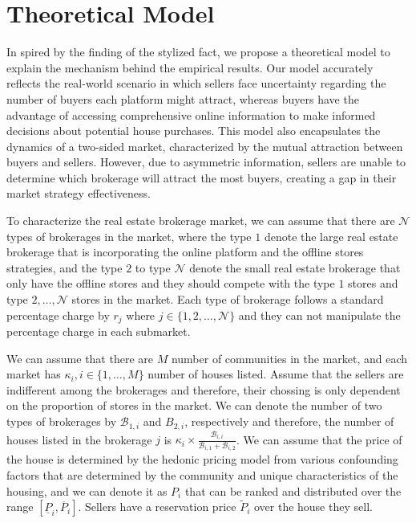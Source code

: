 \documentclass[12pt]{article}
\begin{document}
\section{Theoretical Model} \label{sec:theoretical_model}




In spired by the finding of the stylized fact, we propose a theoretical model to explain the mechanism behind the empirical results. Our model accurately reflects the real-world scenario in which sellers face uncertainty regarding the number of buyers each platform might attract, whereas buyers have the advantage of accessing comprehensive online information to make informed decisions about potential house purchases. This model also encapsulates the dynamics of a two-sided market, characterized by the mutual attraction between buyers and sellers. However, due to asymmetric information, sellers are unable to determine which brokerage will attract the most buyers, creating a gap in their market strategy effectiveness.

To characterize the real estate brokerage market, we can assume that there are $\mathcal{N}$ types of brokerages in the market, where the type $1$ denote the large real estate brokerage that is incorporating the online platform and the offline stores strategies, and the type $2$ to type $\mathcal{N}$ denote the small real estate brokerage that only have the offline stores and they should compete with the type $1$ stores and type $2, \ldots, \mathcal{N}$ stores in the market. Each type of brokerage follows a standard percentage charge by $r_j$ where $j \in \{1, 2, \ldots, \mathcal{N}\}$ and they can not manipulate the percentage charge in each submarket.

We can assume that there are $M$ number of communities in the market, and each market has $\kappa_i, i \in \{1, \ldots, M\}$ number of houses listed. Assume that the sellers are indifferent among the brokerages and therefore, their chossing is only dependent on the proportion of stores in the market. We can denote the number of two types of brokerages by $\mathcal{B}_{1, i}$ and $B_{2, i}$, respectively and therefore, the number of houses listed in the brokerage $j$ is $\kappa_{i} \times \frac{\mathcal{B}_{i, i}}{\mathcal{B}_{i, 1} + \mathcal{B}_{i, 2}}$. We can assume that the price of the house is determined by the hedonic pricing model from various confounding factors that are determined by the community and unique characteristics of the housing, and we can denote it as $P_i$ that can be ranked and distributed over the range $[\underline{P}_i, \overline{P}_i]$. Sellers have a reservation price $\tilde{P}_i$ over the house they sell.
\end{document}
